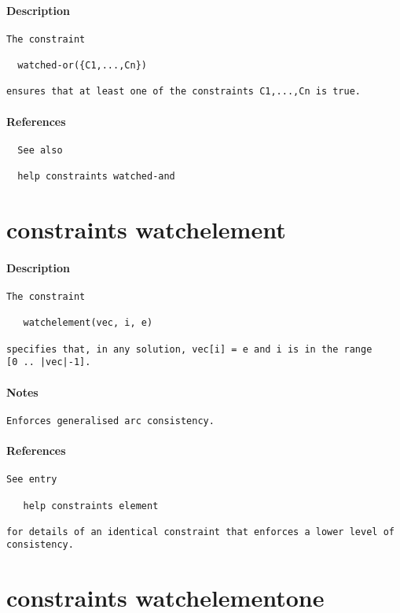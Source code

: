 \paragraph{Description}
{\footnotesize
\begin{verbatim}
The constraint

  watched-or({C1,...,Cn})

ensures that at least one of the constraints C1,...,Cn is true.
\end{verbatim}
}
\paragraph{References}
{\footnotesize
\begin{verbatim}
  See also

  help constraints watched-and
\end{verbatim}
}
\section{constraints watchelement}
\paragraph{Description}
{\footnotesize
\begin{verbatim}
The constraint 

   watchelement(vec, i, e)

specifies that, in any solution, vec[i] = e and i is in the range 
[0 .. |vec|-1].
\end{verbatim}
}
\paragraph{Notes}
{\footnotesize
\begin{verbatim}
Enforces generalised arc consistency.
\end{verbatim}
}
\paragraph{References}
{\footnotesize
\begin{verbatim}
See entry

   help constraints element

for details of an identical constraint that enforces a lower level of
consistency.
\end{verbatim}
}
\section{constraints watchelement\textunderscore one}
